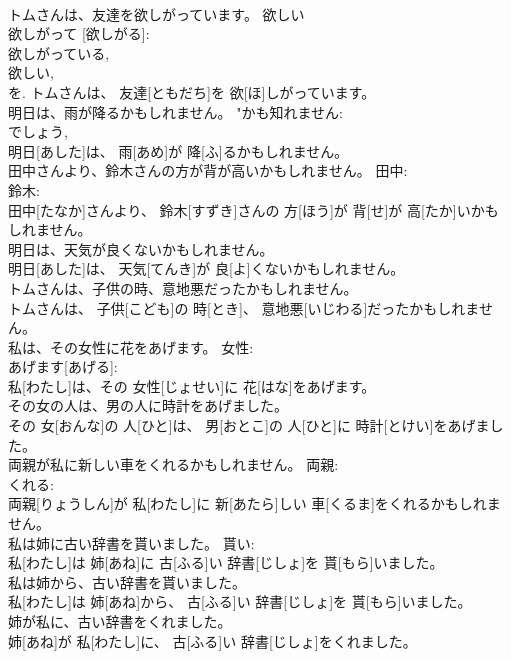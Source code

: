 \documentclass[8pt]{extreport}
\begin{document}
\begin{CJK}{UTF8}{min}
\\	トムさんは、友達を欲しがっています。	欲しい 
\\	欲しがって [欲しがる]: 
\\	欲しがっている, 
\\	欲しい, 
\\	を.	トムさんは、 友達[ともだち]を 欲[ほ]しがっています。	
\\	明日は、雨が降るかもしれません。	"かも知れません: 
\\	でしょう, 
\\	明日[あした]は、 雨[あめ]が 降[ふ]るかもしれません。	
\\	田中さんより、鈴木さんの方が背が高いかもしれません。	田中: 
\\	鈴木: 
\\	田中[たなか]さんより、 鈴木[すずき]さんの 方[ほう]が 背[せ]が 高[たか]いかもしれません。	
\\	明日は、天気が良くないかもしれません。	
\\	明日[あした]は、 天気[てんき]が 良[よ]くないかもしれません。	
\\	トムさんは、子供の時、意地悪だったかもしれません。	
\\	トムさんは、 子供[こども]の 時[とき]、 意地悪[いじわる]だったかもしれません。	
\\	私は、その女性に花をあげます。	女性: 
\\	あげます[あげる]: 
\\	私[わたし]は、その 女性[じょせい]に 花[はな]をあげます。	
\\	その女の人は、男の人に時計をあげました。	
\\	その 女[おんな]の 人[ひと]は、 男[おとこ]の 人[ひと]に 時計[とけい]をあげました。	
\\	両親が私に新しい車をくれるかもしれません。	両親: 
\\	くれる: 
\\	両親[りょうしん]が 私[わたし]に 新[あたら]しい 車[くるま]をくれるかもしれません。	
\\	私は姉に古い辞書を貰いました。	貰い: 
\\	私[わたし]は 姉[あね]に 古[ふる]い 辞書[じしょ]を 貰[もら]いました。	
\\	私は姉から、古い辞書を貰いました。	
\\	私[わたし]は 姉[あね]から、 古[ふる]い 辞書[じしょ]を 貰[もら]いました。	
\\	姉が私に、古い辞書をくれました。	
\\	姉[あね]が 私[わたし]に、 古[ふる]い 辞書[じしょ]をくれました。	

\end{CJK}
\end{document}
